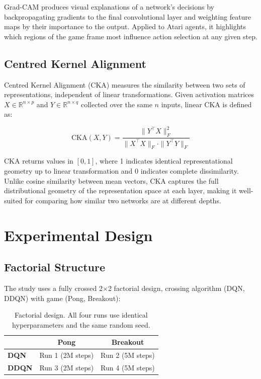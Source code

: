 \documentclass[a4paper]{article}
\begin{document}
Grad-CAM \cite{selvaraju2017grad} produces visual explanations of a network's decisions by backpropagating gradients to the final convolutional layer and weighting feature maps by their importance to the output. Applied to Atari agents, it highlights which regions of the game frame most influence action selection at any given step.

\subsection{Centred Kernel Alignment}

Centred Kernel Alignment (CKA) \cite{kornblith2019similarity} measures the similarity between two sets of representations, independent of linear transformations. Given activation matrices $X \in \mathbb{R}^{n \times p}$ and $Y \in \mathbb{R}^{n \times q}$ collected over the same $n$ inputs, linear CKA is defined as:

\begin{equation}
    \text{CKA}(X, Y) = \frac{\|Y^{\top}X\|_F^2}{\|X^{\top}X\|_F \cdot \|Y^{\top}Y\|_F}
\end{equation}

CKA returns values in $[0, 1]$, where 1 indicates identical representational geometry up to linear transformation and 0 indicates complete dissimilarity. Unlike cosine similarity between mean vectors, CKA captures the full distributional geometry of the representation space at each layer, making it well-suited for comparing how similar two networks are at different depths.

\section{Experimental Design}
\label{sec:method}

\subsection{Factorial Structure}

The study uses a fully crossed 2$\times$2 factorial design, crossing algorithm (DQN, DDQN) with game (Pong, Breakout):

\begin{table}[H]
\centering
\caption{Factorial design. All four runs use identical hyperparameters and the same random seed.}
\label{tab:factorial}
\begin{tabular}{lcc}
\toprule
 & \textbf{Pong} & \textbf{Breakout} \\
\midrule
\textbf{DQN}  & Run 1 (2M steps) & Run 2 (5M steps) \\
\textbf{DDQN} & Run 3 (2M steps) & Run 4 (5M steps) \\
\bottomrule
\end{tabular}
\end{table}
\end{document}
